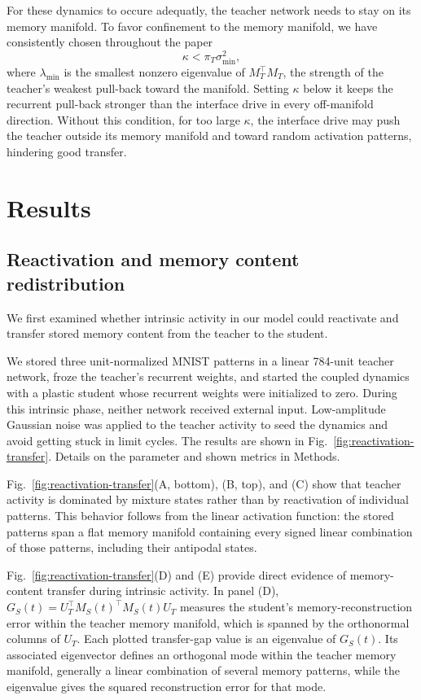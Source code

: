 \documentclass[10pt,letterpaper]{article}
\theoremstyle{plain}
\theoremstyle{remark}
\begin{document}
For these dynamics to occure adequatly, the teacher network needs to stay on its memory manifold.
To favor confinement to the memory manifold, we have consistently chosen throughout the paper
\begin{equation}
\kappa<\pi_T\sigma_{\min}^2,
\label{eq:redistribution-confinement-regime}
\end{equation}
where $\lambda_{\min}$ is the smallest nonzero eigenvalue of $M_T^\top M_T$, the strength of the teacher's weakest pull-back toward the manifold. Setting $\kappa$ below it keeps the recurrent pull-back stronger than the interface drive in every off-manifold direction. 
Without this condition, for too large $\kappa$, the interface drive may push the teacher outside its memory manifold and toward random activation patterns, hindering good transfer. 
\clearpage

\section{Results}

\subsection{Reactivation and memory content redistribution}
We first examined whether intrinsic activity in our model could reactivate and transfer stored memory content from the teacher to the student.

We stored three unit-normalized MNIST patterns in a linear 784-unit teacher network, froze the teacher's recurrent weights, and started the coupled dynamics with a plastic student whose recurrent weights were initialized to zero. During this intrinsic phase, neither network received external input. Low-amplitude Gaussian noise was applied to the teacher activity to seed the dynamics and avoid getting stuck in limit cycles. The results are shown in Fig.~\ref{fig:reactivation-transfer}. Details on the parameter and shown metrics in Methods.

Fig.~\ref{fig:reactivation-transfer}(A, bottom), (B, top), and (C) show that teacher activity is dominated by mixture states rather than by reactivation of individual patterns. This behavior follows from the linear activation function: the stored patterns span a flat memory manifold containing every signed linear combination of those patterns, including their antipodal states. 


Fig.~\ref{fig:reactivation-transfer}(D) and (E) provide direct evidence of memory-content transfer during intrinsic activity. In panel (D), \(G_S(t)=U_T^\top M_S(t)^\top M_S(t)U_T\) measures the student's memory-reconstruction error within the teacher memory manifold, which is spanned by the orthonormal columns of \(U_T\). Each plotted transfer-gap value is an eigenvalue of \(G_S(t)\). Its associated eigenvector defines an orthogonal mode within the teacher memory manifold, generally a linear combination of several memory patterns, while the eigenvalue gives the squared reconstruction error for that mode.
\end{document}
